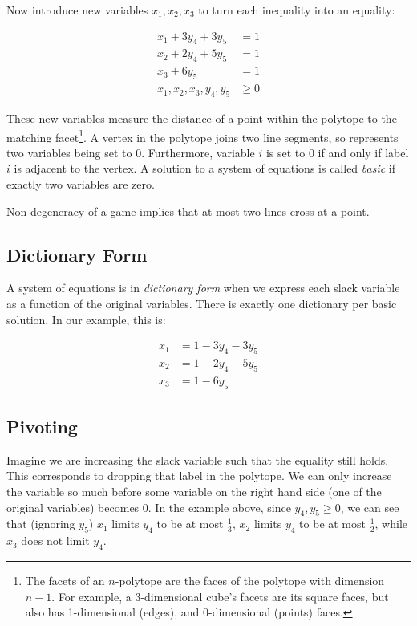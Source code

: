 Now introduce new variables $x_1, x_2, x_3$ to turn each inequality into an
equality:

\begin{equation*}
	\begin{split}
		x_1 + 3y_4 + 3y_5 & = 1 \\
		x_2 + 2y_4 + 5y_5 & = 1 \\
		x_3 + 6y_5 & = 1 \\
		x_1, x_2, x_3, y_4, y_5 & \ge 0
	\end{split}
\end{equation*}

These new variables measure the distance of a point within the polytope to the
matching facet\footnote{The facets of an $n$-polytope are the faces of the
polytope with dimension $n-1$. For example, a 3-dimensional cube's facets are
its square faces, but also has 1-dimensional (edges), and 0-dimensional
(points) faces.}. A vertex in the polytope joins two line segments, so
represents two variables being set to 0. Furthermore, variable $i$ is set to 0
if and only if label $i$ is adjacent to the vertex. A solution to a system of
equations is called \textit{basic} if exactly two variables are zero.

\begin{fact}
	Non-degeneracy of a game implies that at most two lines cross at a point.
\end{fact}

\subsection{Dictionary Form}

A system of equations is in \textit{dictionary form} when we express each slack
variable as a function of the original variables. There is exactly one
dictionary per basic solution. In our example, this is:

\begin{equation*}
	\begin{split}
		x_1 & = 1 - 3y_4 - 3y_5 \\
		x_2 & = 1 - 2y_4 - 5y_5 \\
		x_3 & = 1 - 6y_5
	\end{split}
\end{equation*}

\subsection{Pivoting}

Imagine we are increasing the slack variable such that the equality still
holds. This corresponds to dropping that label in the polytope.  We can only
increase the variable so much before some variable on the right hand side (one
of the original variables) becomes 0. In the example above, since $y_4, y_5 \ge
0$, we can see that (ignoring $y_5$) $x_1$ limits $y_4$ to be at most
$\frac{1}{3}$, $x_2$ limits $y_4$ to be at most $\frac{1}{2}$, while $x_3$ does
not limit $y_4$.
